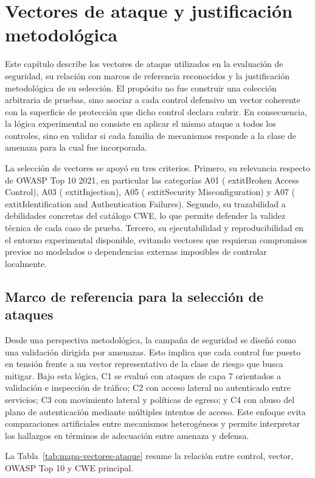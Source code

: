 \chapter{Vectores de ataque y justificación metodológica}
\label{cap:vectores-ataque-20260522}

Este capítulo describe los vectores de ataque utilizados en la evaluación de seguridad, su relación con marcos de referencia reconocidos y la justificación metodológica de su selección. El propósito no fue construir una colección arbitraria de pruebas, sino asociar a cada control defensivo un vector coherente con la superficie de protección que dicho control declara cubrir. En consecuencia, la lógica experimental no consiste en aplicar el mismo ataque a todos los controles, sino en validar si cada familia de mecanismos responde a la clase de amenaza para la cual fue incorporada.

La selección de vectores se apoyó en tres criterios. Primero, su relevancia respecto de OWASP Top 10 2021, en particular las categorías A01 (	extit{Broken Access Control}), A03 (	extit{Injection}), A05 (	extit{Security Misconfiguration}) y A07 (	extit{Identification and Authentication Failures}). Segundo, su trazabilidad a debilidades concretas del catálogo CWE, lo que permite defender la validez técnica de cada caso de prueba. Tercero, su ejecutabilidad y reproducibilidad en el entorno experimental disponible, evitando vectores que requieran compromisos previos no modelados o dependencias externas imposibles de controlar localmente.

\section{Marco de referencia para la selección de ataques}

Desde una perspectiva metodológica, la campaña de seguridad se diseñó como una validación dirigida por amenazas. Esto implica que cada control fue puesto en tensión frente a un vector representativo de la clase de riesgo que busca mitigar. Bajo esta lógica, C1 se evaluó con ataques de capa 7 orientados a validación e inspección de tráfico; C2 con acceso lateral no autenticado entre servicios; C3 con movimiento lateral y políticas de egreso; y C4 con abuso del plano de autenticación mediante múltiples intentos de acceso. Este enfoque evita comparaciones artificiales entre mecanismos heterogéneos y permite interpretar los hallazgos en términos de adecuación entre amenaza y defensa.

La Tabla~\ref{tab:mapa-vectores-ataque} resume la relación entre control, vector, OWASP Top 10 y CWE principal.

